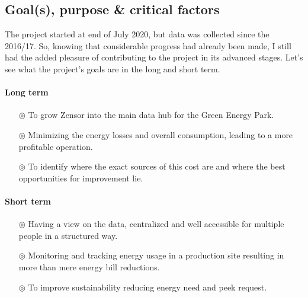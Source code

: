 \subsection{Goal(s), purpose \& critical factors}

The project started at end of July 2020, but data was collected since the 2016/17. 
So, knowing that considerable progress had already been made, I still had the added pleasure of contributing to the project in its advanced stages.
Let's see what the project's goals are in the long and short term.

\paragraph{Long term}
\begin{itemize}
    \item[$\circledcirc$] To grow Zensor into the main data hub for the Green Energy Park.
    \item[$\circledcirc$] Minimizing the energy losses and overall consumption, leading to a more profitable operation.
    \item[$\circledcirc$] To identify where the exact sources of this cost are and where the best opportunities for improvement lie.
\end{itemize}

\paragraph{Short term}
\begin{itemize}
    \item[$\circledcirc$] Having a view on the data, centralized and well accessible for multiple people in a structured way.
    \item[$\circledcirc$] Monitoring and tracking energy usage in a production site resulting in more than mere energy bill reductions.
    \item[$\circledcirc$] To improve sustainability reducing energy need and peek request. 
\end{itemize}

